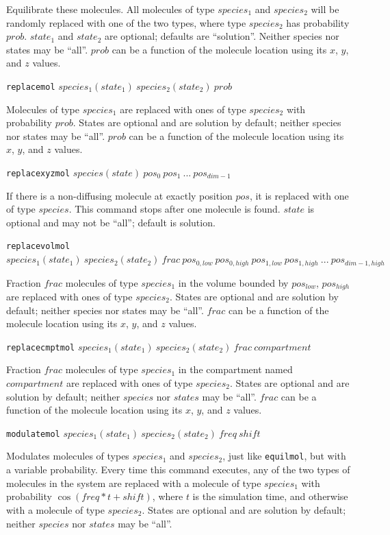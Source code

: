\documentclass {book}
\newcommand {\ttt} {\texttt}
\begin{document}
\begin{description}
Equilibrate these molecules. All molecules of type $species_1$ and $species_2$ will be randomly replaced with one of the two types, where type $species_2$ has probability $prob$. $state_1$ and $state_2$ are optional; defaults are ``solution''. Neither species nor states may be ``all''. $prob$ can be a function of the molecule location using its $x$, $y$, and $z$ values.

\item{\ttt{replacemol} $species_1(state_1)\ species_2(state_2)\ prob$}

Molecules of type $species_1$ are replaced with ones of type $species_2$ with probability $prob$. States are optional and are solution by default; neither species nor states may be ``all''. $prob$ can be a function of the molecule location using its $x$, $y$, and $z$ values.

\item{\ttt{replacexyzmol} $species(state)\ pos_0\ pos_1\ ...\ pos_{dim-1}$}

If there is a non-diffusing molecule at exactly position $pos$, it is replaced with one of type $species$. This command stops after one molecule is found. $state$ is optional and may not be ``all''; default is solution.

\item{\ttt{replacevolmol} $species_1(state_1)\ species_2(state_2)\ frac\ pos_{0,low}\ pos_{0,high}\ pos_{1,low}\ pos_{1,high}\ ...\ pos_{dim-1,high}$}

Fraction $frac$ molecules of type $species_1$ in the volume bounded by $pos_{low}$, $pos_{high}$ are replaced with ones of type $species_2$. States are optional and are solution by default; neither species nor states may be ``all''. $frac$ can be a function of the molecule location using its $x$, $y$, and $z$ values.

\item{\ttt{replacecmptmol} $species_1(state_1)\ species_2(state_2)\ frac\ compartment$}

Fraction $frac$ molecules of type $species_1$ in the compartment named $compartment$ are replaced with ones of type $species_2$. States are optional and are solution by default; neither $species$ nor $states$ may be ``all''. $frac$ can be a function of the molecule location using its $x$, $y$, and $z$ values.

\item{\ttt{modulatemol} $species_1(state_1)\ species_2(state_2)\ freq\ shift$}

Modulates molecules of types $species_1$ and $species_2$, just like \ttt{equilmol}, but with a variable probability. Every time this command executes, any of the two types of molecules in the system are replaced with a molecule of type $species_1$ with probability $\cos(freq*t+shift)$, where $t$ is the simulation time, and otherwise with a molecule of type $species_2$. States are optional and are solution by default; neither $species$ nor $states$ may be ``all''.


\end{description}
\end{document}
